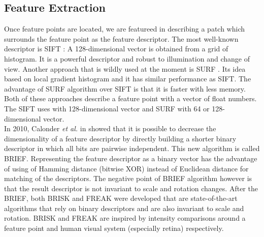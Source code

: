 \subsection{Feature Extraction}
Once feature points are located, we are featureed in describing a patch which surrounds the feature point as the feature descriptor. The most well-known descriptor is SIFT \cite{lowe2004distinctive}: A 128-dimensional vector is obtained from a grid of histogram. It is a powerful descriptor and robust to illumination and change of view. Another approach that is wildly used at the moment is SURF \cite{bay2006surf}. Its idea based on local gradient histogram and it has similar performance as SIFT. The advantage of SURF algorithm over SIFT is that it is faster with less memory. Both of these approaches describe a feature point with a vector of float numbers. The SIFT uses with 128-dimensional vector and SURF with 64 or 128-dimensional vector.\\
In 2010, Calonder \textit{et al.} in \cite{calonder2010brief} showed that it is possible to decrease the dimensionality of a feature descriptor by directly building a shorter binary descriptor in which all bits are pairwise independent. This new algorithm is called BRIEF. Representing the feature descriptor as a binary vector has the advantage of using of Hamming distance (bitwise XOR) instead of Euclidean distance for matching of the descriptors. The negative point of BRIEF algorithm however is that the result descriptor is not invariant to scale and rotation changes. After the BRIEF, both BRISK \cite{leutenegger2011brisk} and FREAK \cite{alahi2012freak} were developed that are state-of-the-art algorithms that rely on binary descriptors and are also invariant to scale and rotation. BRISK and FREAK are inspired by intensity comparisons around a feature point and human visual system (especially retina) respectively.

